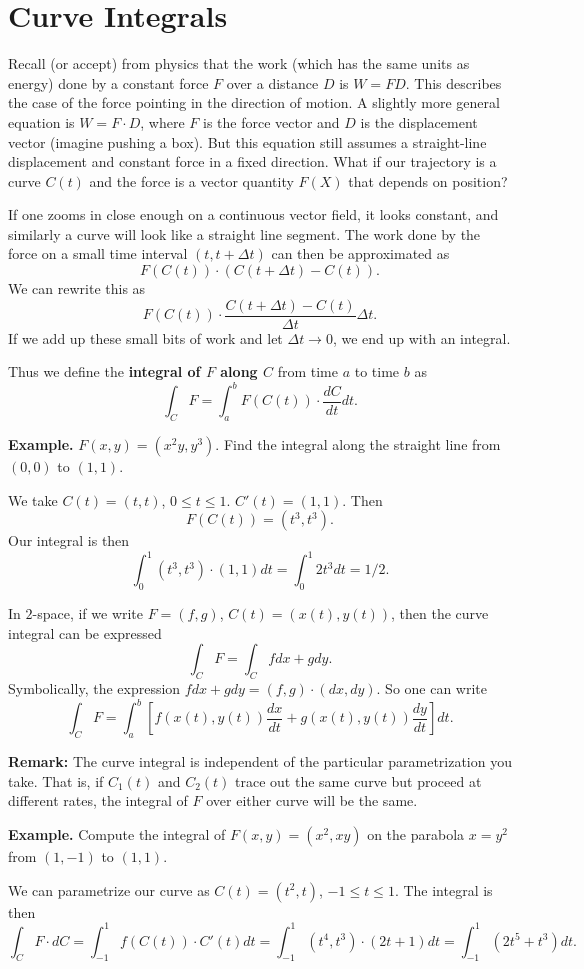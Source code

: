 \documentclass{article}
\begin{document}

\section*{Curve Integrals}

Recall (or accept) from physics that the work 
(which has the same units as energy) done by a constant force $F$ over a distance $D$ is 
$W=FD$. This describes the case of the force pointing in the direction
of motion. A slightly more general equation is $W = F \cdot D$, where
$F$ is the force vector and $D$ is the displacement vector (imagine pushing a box). But this 
equation still assumes a straight-line displacement and constant force in a fixed direction.
What if our trajectory is a curve $C(t)$ and the force is a vector quantity $F(X)$ that depends
on position?

If one zooms in close enough on a continuous vector field, it looks
constant, and similarly a curve will look like a straight line segment.
The work done by the force on a small time interval $(t, t + \Delta t)$ can then be approximated as 
\[F(C(t))\cdot (C(t+\Delta t)-C(t)).\]
We can rewrite this as 
\[F(C(t))\cdot \frac{C(t+\Delta t) - C(t)}{\Delta t}\Delta t.\]
If we add up these small bits of work and let $\Delta t \to 0$, we end
up with an integral.

Thus we define the \textbf{integral of $F$ along $C$} from time $a$ to time $b$ as 
\[\int_C F = \int_a^b F(C(t))\cdot \frac{dC}{dt} dt.\]

\textbf{Example.} $F(x,y) = (x^2y, y^3)$. Find the integral along the straight line
from $(0,0)$ to $(1,1)$.

We take $C(t) = (t,t)$, $0 \leq t \leq 1$. $C'(t) = (1,1)$. Then 
\[F(C(t)) = (t^3,t^3).\]
Our integral is then
\[\int_0^1 (t^3,t^3)\cdot (1,1)dt = \int_0^1 2t^3 dt = 1/2.\]

In $2$-space, if we write $F = (f,g)$, $C(t) = (x(t),y(t))$, then the curve integral
can be expressed
\[\int_C F = \int_C fdx + gdy.\]
Symbolically, the expression $fdx + gdy = (f,g)\cdot (dx,dy)$. So one can write
\[\int_C F = \int_a^b \left[ f(x(t),y(t))\frac{dx}{dt} + g(x(t),y(t))\frac{dy}{dt}\right]dt.\]

\textbf{Remark:} The curve integral is independent of the particular 
parametrization you take. That is, if $C_1(t)$ and $C_2(t)$ trace out the same
curve but proceed at different rates, the integral of $F$ over either
curve will be the same.

\textbf{Example.} Compute the integral of $F(x,y) = (x^2, xy)$ on the parabola $x=y^2$ from $(1,-1)$ to $(1,1)$.

We can parametrize our curve as $C(t) = (t^2, t)$, $-1 \leq t \leq 1$. The integral is then
\[\int_C F \cdot dC = \int_{-1}^1 f(C(t))\cdot C'(t)dt = \int_{-1}^1(t^4,t^3)\cdot(2t+1)dt = \int_{-1}^1 (2t^5 + t^3)dt.\]
\end{document}
